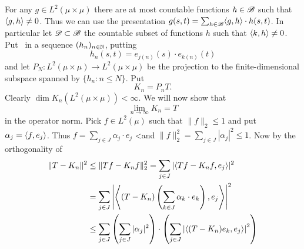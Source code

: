 \begin{enumerate}
\begin{itemize}
\iffalse
\textbf{Basis.}
Pick arbitrary \(g \in L^2(\mu\times\mu)\) there are at most countable
functions \(f\in \scrB\) such that \(\lrangle{g,f} \neq 0\).
Denote this countable subset \(\scrD \subset \scrB\) and
put it in a sequence \((f_n)_{n\in\N}\)
where each is of the form \(f_j(s,t) = e_{j(n)}(s)\cdot e_{k(n)}(t)\).
Similarly, let \(P_N: L^2(\mu\times\mu) \to L^2(\mu\times\mu)\)
be the projection to the finite-dimensional subspace spanned by
\(\{f_n: n\leq N\}\). Now
\begin{align*}
\|g - P_N(g)\|_2^2
&= \int_{\Omega^2} |g(s,t) - \sum_{n=1}^N g(s,t)\cdot f_n(s,t)|^2\,d(\mu^2)(s,t)
\end{align*}
\fi

For any \(g \in L^2(\mu\times\mu)\) there are at most countable
functions \(h\in \mathscr{B}\) such that \(\langle g,h \rangle \neq 0\).
Thus we can use the presentation 
\(g(s,t) = \sum_{h\in\mathscr{B}} \langle g,h \rangle\cdot h(s,t)\).
In particular let \(\scrD \subset \scrB\) the countable
subset of functions $h$ such that  \(\langle k,h \rangle\neq 0\).
Put \scrD\ in a sequence \((h_n)_{n\in\mathbb{N}}\),
putting 
\begin{equation*}
h_n(s,t) = e_{j(n)}(s)\cdot e_{k(n)}(t)
\end{equation*}
and let 
\(P_N: L^2(\mu\times\mu) \to L^2(\mu\times\mu)\)
be the projection to the finite-dimensional subspace spanned by
\(\{h_n: n\leq N\}\).
Put 
\begin{equation*}
K_n = P_nT.
\end{equation*}
Clearly \(\dim K_n(L^2(\mu\times\mu)) < \infty\).
We will now show that 
\begin{equation} \label{eq:limKn:T}
\lim_{n\to\infty} K_n = T
\end{equation}
in the operator norm.
Pick \(f\in L^2(\mu)\) such that \(\|f\|_2 \leq 1\)
and put \(\alpha_j = \langle f,e_j \rangle\).
Thus \(f=\sum_{j\in J} \alpha_j\cdot e_j\)
<and \(\|f\|_2^2 = \sum_{j\in J} |\alpha_j|^2 \leq 1\).
Now by the orthogonality of \scrB
\begin{align}
\|T-K_n\|^2 
&\leq 
 \|Tf - K_n f\|_2^2
 = \sum_{j\in J} |\lrangle{Tf - K_nf, e_j}|^2  \notag \\
&= \sum_{j\in J} 
   \left|
     \lrbangle{(T - K_n)
       \left(\sum_{k\in J}\alpha_k\cdot e_k\right), e_j}
   \right|^2 \notag \\
&\leq \label{eq:ex4.15:csineq}
 \sum_{j\in J} 
   \left(\sum_{j\in J} |\alpha_j|^2\right)
   \cdot
   \left(\sum_{j\in J} \left|\lrbangle{(T - K_n)e_k, e_j}\right|^2 \right) \\

\end{align}
\end{itemize}
\end{enumerate}
